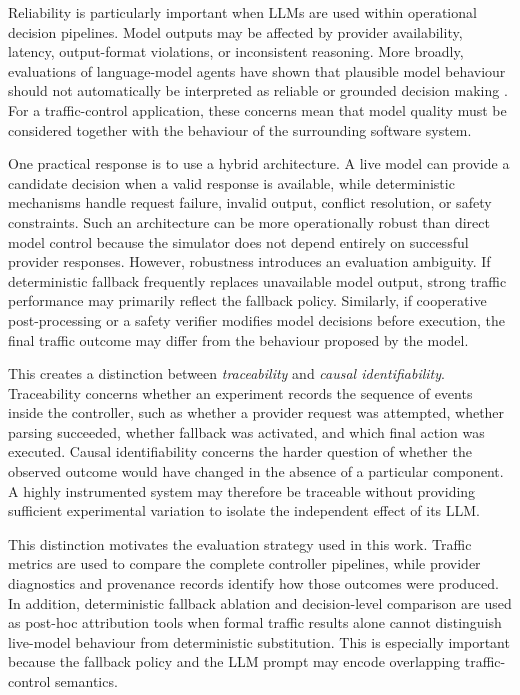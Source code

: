 \documentclass[letterpaper,10pt,conference]{ieeeconf}
\begin{document}
Reliability is particularly important when LLMs are used within operational decision pipelines. Model outputs may be affected by provider availability, latency, output-format violations, or inconsistent reasoning. More broadly, evaluations of language-model agents have shown that plausible model behaviour should not automatically be interpreted as reliable or grounded decision making \cite{Xie2025}. For a traffic-control application, these concerns mean that model quality must be considered together with the behaviour of the surrounding software system.



One practical response is to use a hybrid architecture. A live model can provide a candidate decision when a valid response is available, while deterministic mechanisms handle request failure, invalid output, conflict resolution, or safety constraints. Such an architecture can be more operationally robust than direct model control because the simulator does not depend entirely on successful provider responses. However, robustness introduces an evaluation ambiguity. If deterministic fallback frequently replaces unavailable model output, strong traffic performance may primarily reflect the fallback policy. Similarly, if cooperative post-processing or a safety verifier modifies model decisions before execution, the final traffic outcome may differ from the behaviour proposed by the model.



This creates a distinction between \emph{traceability} and \emph{causal identifiability}. Traceability concerns whether an experiment records the sequence of events inside the controller, such as whether a provider request was attempted, whether parsing succeeded, whether fallback was activated, and which final action was executed. Causal identifiability concerns the harder question of whether the observed outcome would have changed in the absence of a particular component. A highly instrumented system may therefore be traceable without providing sufficient experimental variation to isolate the independent effect of its LLM.



This distinction motivates the evaluation strategy used in this work. Traffic metrics are used to compare the complete controller pipelines, while provider diagnostics and provenance records identify how those outcomes were produced. In addition, deterministic fallback ablation and decision-level comparison are used as post-hoc attribution tools when formal traffic results alone cannot distinguish live-model behaviour from deterministic substitution. This is especially important because the fallback policy and the LLM prompt may encode overlapping traffic-control semantics.
\end{document}
